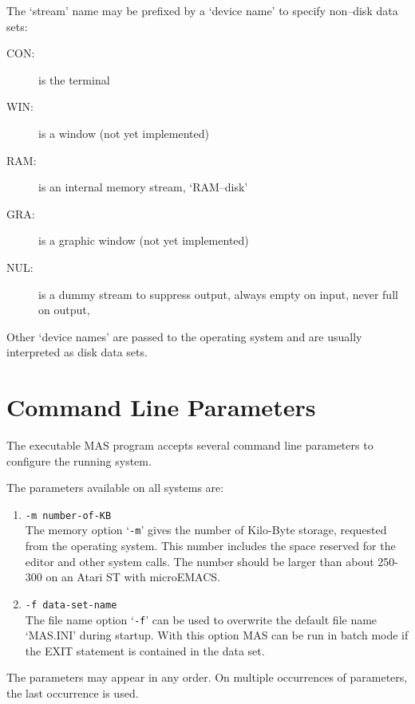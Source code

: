 The `stream' name may be prefixed by a `device name' to specify
non--disk data sets:
\begin{description}
\item[CON:] is the terminal
\item[WIN:] is a window (not yet implemented)
\item[RAM:] is an internal memory stream, 
            `RAM--disk'
\item[GRA:] is a graphic window (not yet implemented)
\item[NUL:] is a dummy stream to suppress output, 
            always empty on input, never full on output,
\end{description}

Other `device names' are passed to the 
operating system and
are usually interpreted as disk data sets.   


\section{Command Line Parameters}

The executable MAS program accepts several 
command line parameters to configure the 
running system. 

The parameters available on all systems are: 
\begin{enumerate}
\item \verb/-m number-of-KB/ \\
      The memory option `\verb/-m/' gives the number of Kilo-Byte
      storage, requested from the operating system. This
      number includes the space reserved for the editor and
      other system calls. The number should be larger than
      about 250-300 on an Atari ST with microEMACS.
\item \verb/-f data-set-name/ \\
      The file name option `\verb/-f/' can be used to overwrite the
      default file name `MAS.INI' during startup. With this
      option MAS can be run in batch mode if the EXIT
      statement is contained in the data set.
\end{enumerate}
The parameters may appear in any order.
On multiple occurrences of parameters, the last
occurrence is used.

